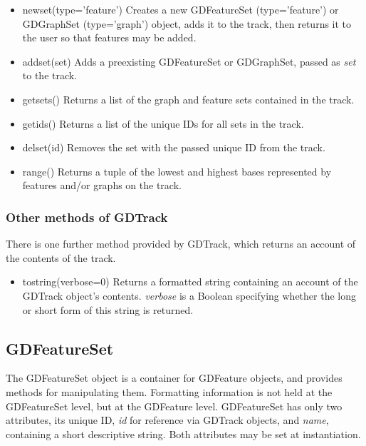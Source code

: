 \documentclass{article}
\begin{document}
\begin{itemize}
\item {new\us set(type='feature')}
Creates a new GDFeatureSet (type='feature') or GDGraphSet (type='graph') 
object, adds it to the track, then returns it to the user so that features 
may be added.

\item {add\us set(set)}
Adds a preexisting GDFeatureSet or GDGraphSet, passed as \textit{set} to the 
track.

\item {get\us sets()}
Returns a list of the graph and feature sets contained in the track.

\item {get\us ids()}
Returns a list of the unique IDs for all sets in the track.

\item {del\us set(id)}
Removes the set with the passed unique ID from the track.

\item {range()}
Returns a tuple of the lowest and highest bases represented by features and/or 
graphs on the track.  
\end{itemize}

\subsubsection{Other methods of GDTrack}
There is one further method provided by GDTrack, which returns an account of 
the contents of the track.

\begin{itemize}
\item {to\us string(verbose=0)}
Returns a formatted string containing an account of the GDTrack object's 
contents.  \textit{verbose} is a Boolean specifying whether the long or short 
form of this string is returned.
\end{itemize}


\subsection{GDFeatureSet}
The GDFeatureSet object is a container for GDFeature objects, and provides 
methods for manipulating them.  Formatting information is not held at the 
GDFeatureSet level, but at the GDFeature level.  GDFeatureSet has only two 
attributes, its unique ID, \textit{id} for reference via GDTrack objects, 
and \textit{name}, containing a short descriptive string.  Both 
attributes may be set at instantiation.
\end{document}
